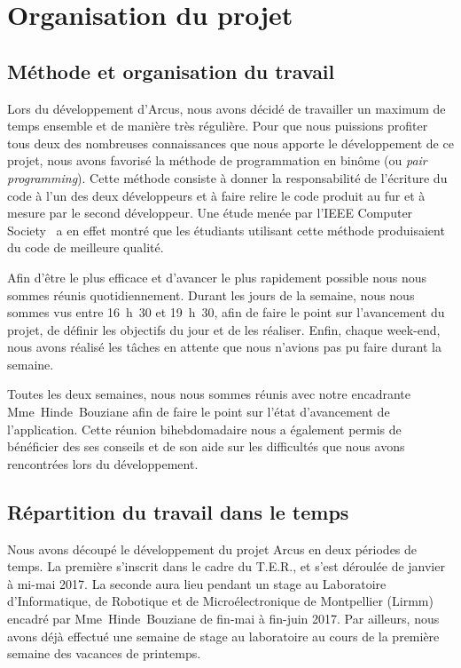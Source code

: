 \chapter{Organisation du projet}

\section{Méthode et organisation du travail}

Lors du développement d'Arcus, nous avons décidé de travailler un maximum de temps ensemble et de manière très régulière. Pour que nous puissions profiter tous deux des nombreuses connaissances que nous apporte le développement de ce projet, nous avons favorisé la méthode de programmation en binôme (ou \emph{pair programming}). Cette méthode consiste à donner la responsabilité de l'écriture du code à l'un des deux développeurs et à faire relire le code produit au fur et à mesure par le second développeur. Une étude menée par l'IEEE Computer Society~\parencite{mcdowell2003} a en effet montré que les étudiants utilisant cette méthode produisaient du code de meilleure qualité.

Afin d'être le plus efficace et d'avancer le plus rapidement possible nous nous sommes réunis quotidiennement. Durant les jours de la semaine, nous nous sommes vus entre 16~h~30 et 19~h~30, afin de faire le point sur l'avancement du projet, de définir les objectifs du jour et de les réaliser. Enfin, chaque week-end, nous avons réalisé les tâches en attente que nous n'avions pas pu faire durant la semaine.

Toutes les deux semaines, nous nous sommes réunis avec notre encadrante Mme~Hinde~Bouziane afin de faire le point sur l'état d'avancement de l'application. Cette réunion bihebdomadaire nous a également permis de bénéficier des ses conseils et de son aide sur les difficultés que nous avons rencontrées lors du développement.

\section{Répartition du travail dans le temps}

Nous avons découpé le développement du projet Arcus en deux périodes de temps. La première s'inscrit dans le cadre du T.E.R., et s'est déroulée de janvier à mi-mai 2017. La seconde aura lieu pendant un stage au Laboratoire d'Informatique, de Robotique et de Microélectronique de Montpellier (Lirmm) encadré par Mme~Hinde~Bouziane de fin-mai à fin-juin 2017. Par ailleurs, nous avons déjà effectué une semaine de stage au laboratoire au cours de la première semaine des vacances de printemps.

